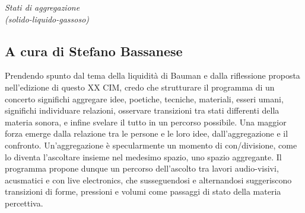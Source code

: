 \documentclass[9pt, twoside, a5paper]{extreport}
\begin{document}
{\fontsize{30}{30}\selectfont \textit{Stati di aggregazione \\ (solido-liquido-gassoso)}}

\subsection*{\textsf{A cura di Stefano Bassanese}}
{\fontsize{8}{8}\selectfont Prendendo spunto dal tema della liquidità di Bauman e dalla riflessione proposta nell'edizione di questo XX CIM, credo che strutturare il programma di un concerto significhi aggregare idee, poetiche, tecniche, materiali, esseri umani, significhi individuare relazioni, osservare transizioni tra stati differenti della materia sonora, e infine svelare il tutto in un percorso possibile. 
Una maggior forza emerge dalla relazione tra le persone e le loro idee, dall'aggregazione e il confronto. Un'aggregazione è specularmente un momento di con/divisione, come lo diventa l'ascoltare insieme nel medesimo spazio, uno spazio aggregante.
Il programma propone dunque un percorso dell'ascolto tra lavori audio-visivi, acusmatici e con live electronics, che susseguendosi e alternandosi suggeriscono transizioni di forme, pressioni e volumi come passaggi di stato della materia percettiva.}

\bigskip
\end{document}
